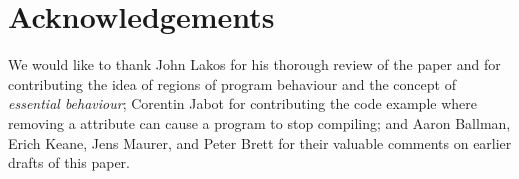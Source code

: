 \section*{Acknowledgements}
We would like to thank John Lakos for his thorough review of the paper and for contributing the idea of regions of program behaviour and the concept of \emph{essential behaviour}; Corentin Jabot for contributing the code example where removing a \mbox{} attribute can cause a program to stop compiling; and Aaron Ballman, Erich Keane, Jens Maurer, and Peter Brett for their valuable comments on earlier drafts of this paper.

\renewcommand{\bibname}{References}



